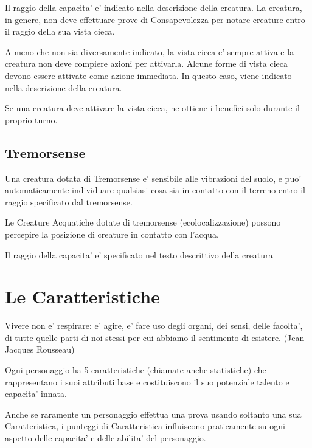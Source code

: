 \documentclass[a4paper,11pt,twoside,openany]{dndbook}
\begin{document}
Il raggio della capacita' e' indicato nella descrizione della creatura. La creatura, in genere, non deve effettuare prove di Consapevolezza per notare creature entro il raggio della sua vista cieca.

A meno che non sia diversamente indicato, la vista cieca e' sempre attiva e la creatura non deve compiere azioni per attivarla. Alcune forme di vista cieca devono essere attivate come azione immediata. In questo caso, viene indicato nella descrizione della creatura.

Se una creatura deve attivare la vista cieca, ne ottiene i benefici solo durante il proprio turno.

\subsection{Tremorsense}
Una creatura dotata di Tremorsense e' sensibile alle vibrazioni del suolo, e puo' automaticamente individuare qualsiasi cosa sia in contatto con il terreno entro il raggio specificato dal tremorsense.

Le Creature Acquatiche dotate di tremorsense (ecolocalizzazione) possono percepire la posizione di creature in contatto con l’acqua.

Il raggio della capacita' e' specificato nel testo descrittivo della creatura

\pagebreak

\section{Le Caratteristiche}

\label{le-caratteristiche}

\begin{quotebox}Vivere non e' respirare: e' agire, e' fare uso degli organi, dei sensi, delle facolta', di tutte quelle parti di noi stessi per cui abbiamo il sentimento di esistere. (Jean-Jacques Rousseau)
\end{quotebox}


Ogni personaggio ha 5 caratteristiche (chiamate anche statistiche) che rappresentano i suoi attributi base e costituiscono il suo potenziale talento e capacita' innata. 

Anche se raramente un personaggio effettua una prova usando soltanto una sua Caratteristica, i punteggi di Caratteristica influiscono praticamente su ogni aspetto delle capacita' e delle abilita' del personaggio.
\end{document}
